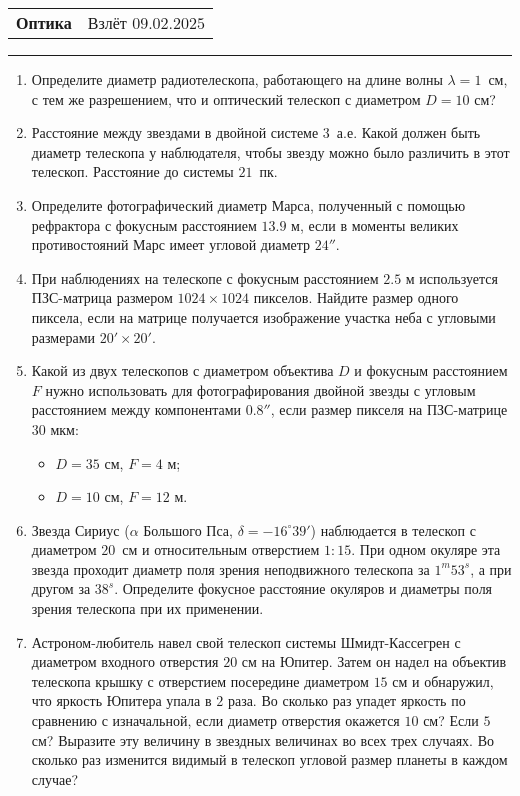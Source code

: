 \documentclass[12pt]{article}
\begin{document}
\begin{tabularx}{\textwidth}{Xr}
{\Large \textbf{Оптика}} & Взлёт $09.02.2025$ \\
\end{tabularx}
\noindent\rule{\textwidth}{0.4pt}
\begin{enumerate}
    \item Определите диаметр   радиотелескопа, работающего на длине волны $\lambda=1$~см, с тем же разрешением, что и оптический телескоп с диаметром $D=10$ см?
    \item Расстояние между звездами в двойной системе $3$~а.е. Какой должен быть диаметр телескопа у наблюдателя, чтобы звезду можно было различить в этот телескоп. Расстояние до системы $21$~пк.
    \item Определите фотографический диаметр Марса, полученный с помощью рефрактора с фокусным расстоянием $13.9$ м, если в моменты великих противостояний Марс имеет угловой диаметр $24''$.
    \item При наблюдениях на телескопе с фокусным расстоянием $2.5$ м используется ПЗС-матрица размером $1024 \times 1024$ пикселов. Найдите размер одного пиксела, если на матрице получается изображение участка неба с угловыми размерами $20' \times 20'$. 
    \item Какой из двух телескопов с диаметром объектива $D$ и фокусным расстоянием $F$ нужно использовать для фотографирования двойной звезды с угловым расстоянием между компонентами $0.8''$, если размер пикселя на ПЗС-матрице $30$ мкм:
	\begin{itemize}
		\item $D = 35$ см, $F = 4$ м;
		\item $D = 10$ см, $F = 12$ м.
	\end{itemize}
    \item Звезда Сириус ($\alpha$ Большого Пса, $\delta=-16^{\circ}39'$) наблюдается в телескоп с диаметром $20$~см и относительным отверстием $1:15$. При одном окуляре эта звезда проходит диаметр поля зрения неподвижного телескопа за $1^m53^s$, а при другом за $38^s$. Определите фокусное расстояние окуляров и диаметры поля зрения телескопа при их применении.
    \item Астроном-любитель навел свой телескоп системы Шмидт-Кассегрен с диаметром входного отверстия $20$ см на Юпитер. Затем он надел на объектив телескопа крышку с отверстием посередине диаметром $15$ см и обнаружил, что яркость Юпитера упала в $2$ раза. Во сколько раз упадет яркость по сравнению с изначальной, если диаметр отверстия окажется $10$ см? Если $5$ см? Выразите эту величину в звездных величинах во всех трех случаях. Во сколько раз изменится видимый в телескоп угловой размер планеты в каждом случае?

\end{enumerate}
\end{document}
